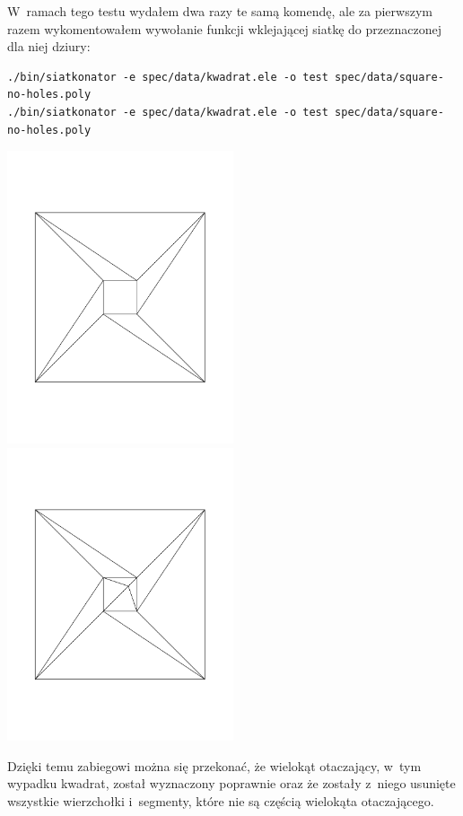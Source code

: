 \documentclass[a4paper]{article} \usepackage{setspace}
\begin{document}
W~ramach tego testu wydałem dwa razy te samą komendę, ale za pierwszym razem wykomentowałem wywołanie funkcji wklejającej siatkę do przeznaczonej dla niej dziury:
\begin{lstlisting}
./bin/siatkonator -e spec/data/kwadrat.ele -o test spec/data/square-no-holes.poly
./bin/siatkonator -e spec/data/kwadrat.ele -o test spec/data/square-no-holes.poly
\end{lstlisting}
\includegraphics[width=0.5\textwidth]{kwadrat_empty.pdf}
\includegraphics[width=0.5\textwidth]{kwadrat_full.pdf}

Dzięki temu zabiegowi można się przekonać, że wielokąt otaczający, w~tym wypadku kwadrat, został wyznaczony poprawnie oraz że zostały z~niego usunięte wszystkie wierzchołki i~segmenty, które nie są częścią wielokąta otaczającego.
\end{document}
